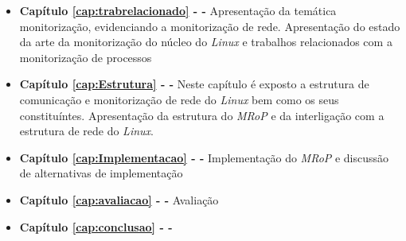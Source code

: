 \begin{itemize}
	\item \textbf{Capítulo \ref{cap:trabrelacionado} -  - } Apresentação da temática monitorização, evidenciando a monitorização de rede. Apresentação do estado da arte da monitorização do núcleo do \textit{Linux} e trabalhos relacionados com a monitorização de processos

	\item \textbf{Capítulo \ref{cap:Estrutura} -   - } Neste capítulo é exposto a estrutura de comunicação e monitorização de rede do \textit{Linux} bem como os seus constituíntes. Apresentação da estrutura do \textit{MRoP} e da interligação com a estrutura de rede do \textit{Linux}.

	\item \textbf{Capítulo \ref{cap:Implementacao} -  - } Implementação do \textit{MRoP} e discussão de alternativas de implementação

	\item \textbf{Capítulo \ref{cap:avaliacao} -  - } Avaliação 

	\item \textbf{Capítulo \ref{cap:conclusao} -  - } 

\end{itemize}
